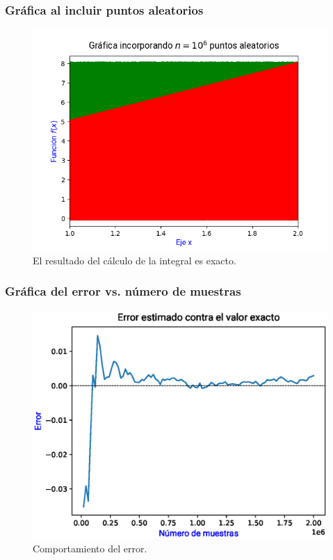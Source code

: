 \begin{frame}
\frametitle{Gráfica al incluir puntos aleatorios}
\begin{figure}
    \centering
    \includegraphics[scale=0.55]{Imagenes/area_puntos_06.png}
    \caption{El resultado del cálculo de la integral es exacto.}
\end{figure}
\end{frame}
\begin{frame}
\frametitle{Gráfica del error vs. número de muestras}
\begin{figure}
    \centering
    \includegraphics[scale=0.55]{Imagenes/area_puntos_07_error.eps}
    \caption{Comportamiento del error.}
\end{figure}
\end{frame}
